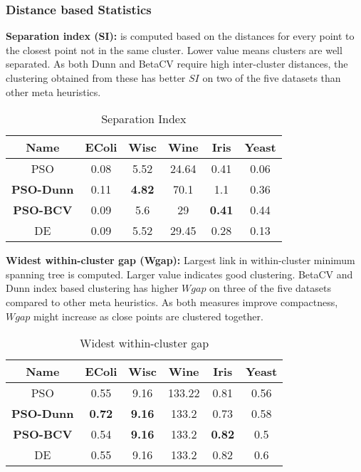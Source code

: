 \documentclass{svproc}
\begin{document}
\subsubsection{Distance based Statistics}


\textbf{Separation index (SI): } is computed based on the distances for every point to the closest point not in the same cluster. Lower value means clusters are well separated. As both Dunn and BetaCV require high inter-cluster distances, the clustering obtained from these has better $SI$ on two of the five datasets than other meta heuristics.

\begin{table}[H]
\caption{Separation Index}
\label{si}
\centering
\begin{tabular}{||c|c|c|c|c|c||}
  \hline
\multicolumn{1}{|c|}{\textbf{Name}} & \multicolumn{1}{c|}{\textbf{EColi}} & \multicolumn{1}{c|}{\textbf{Wisc}} & \multicolumn{1}{c|}{\textbf{Wine}} & \multicolumn{1}{c|}{\textbf{Iris}} & \multicolumn{1}{c|}{\textbf{Yeast}}\\
  \hline\hline
   PSO & 0.08 & 5.52 & 24.64 & 0.41 & 0.06 \\ [0.5ex]
   \hline
   \textbf{PSO-Dunn} & 0.11 & \textbf{4.82} & 70.1 & 1.1 & 0.36 \\
   \hline
  \textbf{PSO-BCV} & 0.09 & 5.6 & 29 & \textbf{0.41} & 0.44 \\
   \hline
  DE & 0.09 & 5.52 & 29.45 & 0.28 & 0.13 \\
   \hline
 
\end{tabular}
\end{table}

\textbf{Widest within-cluster gap (Wgap): } Largest link in within-cluster minimum spanning tree is computed. Larger value indicates good clustering. BetaCV and Dunn index based clustering has higher $Wgap$ on three of the five datasets compared to other meta heuristics. As both measures improve compactness, $Wgap$ might increase as close points are clustered together. 

\begin{table}[H]
\caption{Widest within-cluster gap}
\label{wwcg}
\centering
\begin{tabular}{||c|c|c|c|c|c||}
  \hline
\multicolumn{1}{|c|}{\textbf{Name}} & \multicolumn{1}{c|}{\textbf{EColi}} & \multicolumn{1}{c|}{\textbf{Wisc}} & \multicolumn{1}{c|}{\textbf{Wine}} & \multicolumn{1}{c|}{\textbf{Iris}} & \multicolumn{1}{c|}{\textbf{Yeast}}\\
  \hline\hline
   PSO & 0.55 & 9.16 & 133.22 & 0.81 & 0.56 \\ [0.5ex]
   \hline
   \textbf{PSO-Dunn} & \textbf{0.72} & \textbf{9.16} & 133.2 & 0.73 & 0.58 \\
   \hline
  \textbf{PSO-BCV} & 0.54 & \textbf{9.16} & 133.2 & \textbf{0.82} & 0.5 \\
   \hline
  DE & 0.55 & 9.16 & 133.2 & 0.82 & 0.6 \\
   \hline
 
\end{tabular}
\end{table}
\end{document}
